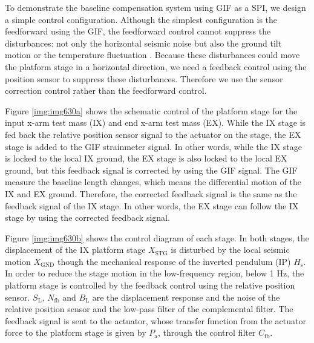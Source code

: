 To demonstrate the baseline compensation system using GIF as a SPI, we design a simple control configuration. Although the simplest configuration is the feedforward using the GIF, the feedforward control cannot suppress the disturbances: not only the horizontal seismic noise but also the ground tilt motion or the temperature fluctuation \cite{sekiguchi2016astudy}. Because these disturbances could move the platform stage in a horizontal direction, we need a feedback control using the position sensor to suppress these disturbances. Therefore we use the sensor correction control rather than the feedforward control. 

Figure \ref{img:img630a} shows the schematic control of the platform stage for the input x-arm test mass (IX) and end x-arm test mass (EX). While the IX stage is fed back the relative position sensor signal to the actuator on the stage, the EX stage is added to the GIF strainmeter signal. In other words, while the IX stage is locked to the local IX ground, the EX stage is also locked to the local EX ground, but this feedback signal is corrected by using the GIF signal. The GIF measure the baseline length changes, which means the differential motion of the IX and EX ground. Therefore, the corrected feedback signal is the same as the feedback signal of the IX stage. In other words, the EX stage can follow the IX stage by using the corrected feedback signal.

Figure \ref{img:img630b} shows the control diagram of each stage. In both stages, the displacement of the IX platform stage $X_{\mathrm{STG}}$ is disturbed by the local seismic motion $X_{\mathrm{GND}}$ though the mechanical response of the inverted pendulum (IP) $H_{\mathrm{s}}$. In order to reduce the stage motion in the low-frequency region, below 1 Hz, the platform stage is controlled by the feedback control using the relative position sensor. $S_{\mathrm{L}},\, N_{\mathrm{fb}}$ and $B_{\mathrm{L}}$ are the displacement response and the noise of the relative position sensor and the low-pass filter of the complemental filter. The feedback signal is sent to the actuator, whose transfer function from the actuator force to the platform stage is given by $P_{\mathrm{a}}$, through the control filter $C_{\mathrm{fb}}$. 

